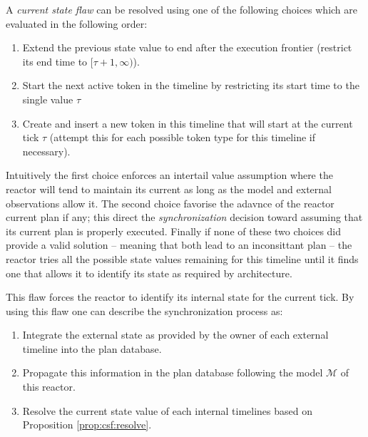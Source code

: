 \begin{proposition}
  \label{prop:csf:resolve}
  A {\em current state flaw} can be resolved using one of the
  following choices which are evaluated in the following order:

  \begin{enumerate}

  \item Extend the previous state value to end after the execution 
    frontier  (\ie restrict its end time to $[\tau+1, \infty)$). %

  \item Start the next active token in the timeline by restricting its
    start time to the single value $\tau$

  \item Create and insert a new token in this timeline that will start
    at the current tick $\tau$ (attempt this for each possible token
    type for this timeline if necessary).

\end{enumerate}
\end{proposition}

Intuitively the first choice enforces an intertail value assumption
where the reactor will tend to maintain its current as long as the
model and external observations allow it. The second choice favorise
the adavnce of the reactor current plan if any; this direct the {\em
  synchronization} decision toward assuming that its current plan is
properly executed. Finally if none of these two choices did provide a
valid solution -- meaning that both lead to an inconsittant plan --
the reactor tries all the possible state values remaining for this
timeline until it finds one that allows it to identify its state as
required by \rx architecture.

This flaw forces the reactor to identify its internal state
for the current tick. By using this flaw one can describe the
synchronization process as:

\begin{enumerate}

\item Integrate the external state as provided by the owner of each
  external timeline into the plan database.

\item Propagate this information in the plan database following the
  model $\mathcal{M}$ of this reactor.

\item Resolve the current state value of each internal timelines based
  on Proposition \ref{prop:csf:resolve}.
\end{enumerate}

